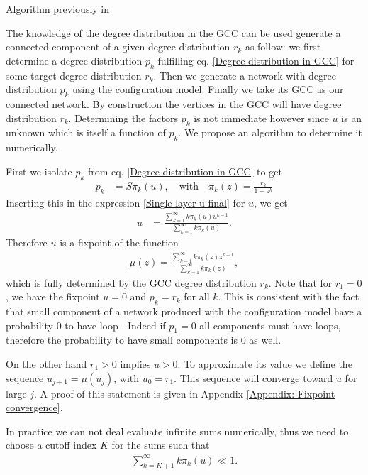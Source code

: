 \documentclass[
11pt, %
english, %
singlespacing, %
nolistspacing, %
liststotoc, %
headsepline, %
]{MastersDoctoralThesis} %
\begin{document}
Algorithm previously in \cite{bialas2008correlations}

The knowledge of the degree distribution in the GCC can be used generate a connected component of a given degree distribution $r_k$ as follow: we first determine a degree distribution $p_k$ fulfilling eq. \eqref{Degree distribution in GCC} for some target degree distribution $r_k$. Then we generate a network with degree distribution $p_k$ using the configuration model. Finally we take its GCC as our connected network. By construction the vertices in the GCC will have degree distribution $r_k$. Determining the factors $p_k$ is not immediate however since $u$ is an unknown which is itself a function of $p_k$. We propose an algorithm to determine it numerically.

First we isolate $p_k$ from eq. \eqref{Degree distribution in GCC} to get
\begin{align}
	p_k &= S \pi_k(u), \quad \text{with} \quad \pi_k(z) = \frac{r_k}{1 - z^k}
\end{align}
Inserting this in the expression \eqref{Single layer u final} for $u$, we get
\begin{align}
	u &= \frac{\sum_{k=1}^\infty k \pi_k(u) u^{k-1}}{\sum_{k=1}^\infty k \pi_k(u)}. \label{Fixpoint equation for u}
\end{align}
Therefore $u$ is a fixpoint of the function
\begin{align}
	\mu(z) = \frac{\sum_{k=1}^\infty k \pi_k(z) z^{k-1}}{\sum_{k=1}^\infty k \pi_k(z)}, \label{Defition of mu}
\end{align}
which is fully determined by the GCC degree distribution $r_k$. Note that for $r_1 = 0$, we have the fixpoint $u = 0$ and $p_k = r_k$ for all $k$. This is consistent with the fact that small component of a network produced with the configuration model have a probability $0$ to have loop \cite{newman2010networks}. Indeed if $p_1 = 0$ all components must have loops, therefore the probability to have small components is $0$ as well.

On the other hand $r_1 > 0$ implies $u > 0$. To approximate its value we define the sequence $u_{j+1} = \mu(u_j)$, with $u_0 = r_1$. This sequence will converge toward $u$ for large $j$. A proof of this statement is given in Appendix \ref{Appendix: Fixpoint convergence}.

In practice we can not deal evaluate infinite sums numerically, thus we need to choose a cutoff index $K$ for the sums such that
\begin{align}
	\sum_{k=K+1}^\infty k \pi_k(u) \ll 1.
\end{align}
\end{document}

